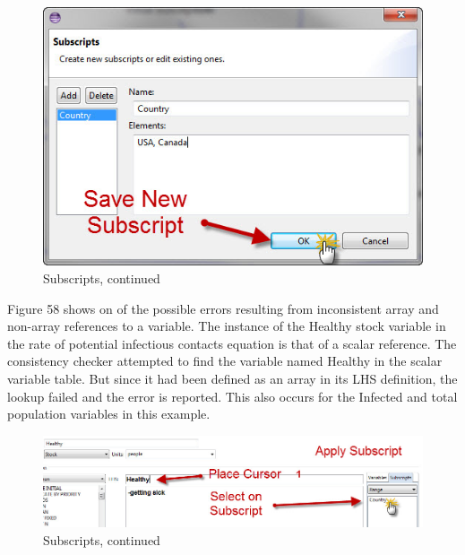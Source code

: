\documentclass[11pt]{amsart}
\begin{document}
\begin{figure}[ht]
\begin{center}
\vspace{.2in}
\centerline {
\includegraphics[totalheight=0.3\textheight]{images/055.jpg}
}
\caption{Subscripts, continued}
\label{fig:055}
\end{center}
\end{figure}


Figure 58 shows on of the possible errors resulting from inconsistent array and non-array references to a variable. The instance of the Healthy stock variable in the rate of potential infectious contacts equation is that of a scalar reference. The consistency checker attempted to find the variable named Healthy in the scalar variable table. But since it had been defined as an array in its LHS definition, the lookup failed and the error is reported. This also occurs for the Infected and total population variables in this example.

\begin{figure}[ht]
\begin{center}
\vspace{.2in}
\centerline {
\includegraphics[totalheight=0.15\textheight]{images/056.jpg}
}
\caption{Subscripts, continued}
\label{fig:056}
\end{center}
\end{figure}
\end{document}
